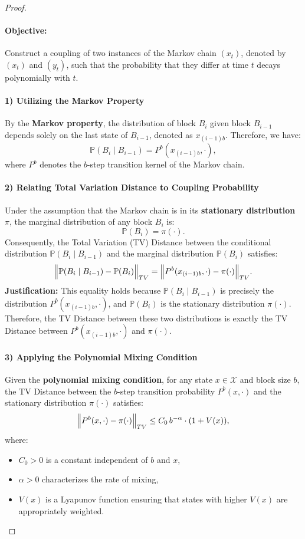 \begin{proof}
\;\newline
\paragraph{Objective:}  
Construct a coupling of two instances of the Markov chain $(x_t)$, denoted by $(x_t)$ and $(y_t)$, such that the probability that they differ at time $t$ decays polynomially with $t$.
\paragraph{1) Utilizing the Markov Property}
By the \textbf{Markov property}, the distribution of block \( B_i \) given block \( B_{i-1} \) depends solely on the last state of \( B_{i-1} \), denoted as \( x_{(i-1)b} \). Therefore, we have:
\[
\mathbb{P}(B_i \mid B_{i-1}) = P^b(x_{(i-1)b}, \cdot),
\]
where \( P^b \) denotes the \( b \)-step transition kernel of the Markov chain.
\paragraph{2) Relating Total Variation Distance to Coupling Probability}
Under the assumption that the Markov chain is in its \textbf{stationary distribution} \( \pi \), the marginal distribution of any block \( B_i \) is:
\[
\mathbb{P}(B_i) = \pi(\cdot).
\]
Consequently, the Total Variation (TV) Distance between the conditional distribution \( \mathbb{P}(B_i \mid B_{i-1}) \) and the marginal distribution \( \mathbb{P}(B_i) \) satisfies:
\[
\Bigl\| \mathbb{P}(B_i \mid B_{i-1}) - \mathbb{P}(B_i) \Bigr\|_{TV}
= \Bigl\| P^b(x_{(i-1)b}, \cdot) - \pi(\cdot) \Bigr\|_{TV}.
\]
\textbf{Justification:}  
This equality holds because \( \mathbb{P}(B_i \mid B_{i-1}) \) is precisely the distribution \( P^b(x_{(i-1)b}, \cdot) \), and \( \mathbb{P}(B_i) \) is the stationary distribution \( \pi(\cdot) \). Therefore, the TV Distance between these two distributions is exactly the TV Distance between \( P^b(x_{(i-1)b}, \cdot) \) and \( \pi(\cdot) \).
\paragraph{3) Applying the Polynomial Mixing Condition}
Given the \textbf{polynomial mixing condition}, for any state \( x \in \mathcal{X} \) and block size \( b \), the TV Distance between the \( b \)-step transition probability \( P^b(x, \cdot) \) and the stationary distribution \( \pi(\cdot) \) satisfies:
\[
\Bigl\| P^b(x, \cdot) - \pi(\cdot) \Bigr\|_{TV}
\leq C_0\,b^{-\alpha} \cdot (1 + V(x)),
\]
where:
\begin{itemize}
    \item \( C_0 > 0 \) is a constant independent of \( b \) and \( x \),
    \item \( \alpha > 0 \) characterizes the rate of mixing,
    \item \( V(x) \) is a Lyapunov function ensuring that states with higher \( V(x) \) are appropriately weighted.
\end{itemize}

\end{proof}
